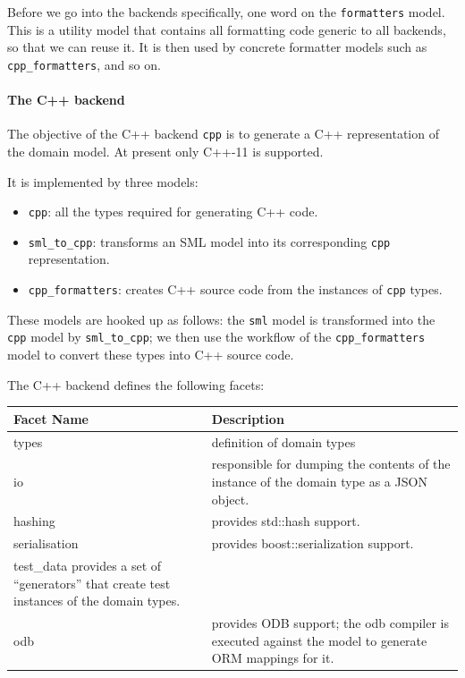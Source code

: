 \documentclass{book}
\begin{document}
Before we go into the backends specifically, one word on the
\texttt{formatters} model. This is a utility model that contains all
formatting code generic to all backends, so that we can reuse it. It
is then used by concrete formatter models such as
\texttt{cpp\_formatters}, and so on.

\paragraph{The C++ backend}

The objective of the C++ backend \texttt{cpp} is to generate a C++
representation of the domain model. At present only C++-11 is
supported.

It is implemented by three models:

\begin{itemize}
\item \texttt{cpp}: all the types required for generating C++ code.
\item \texttt{sml\_to\_cpp}: transforms an SML model into its
  corresponding \texttt{cpp} representation.
\item \texttt{cpp\_formatters}: creates C++ source code from the
  instances of \texttt{cpp} types.
\end{itemize}

These models are hooked up as follows: the \texttt{sml} model is
transformed into the \texttt{cpp} model by \texttt{sml\_to\_cpp}; we
then use the workflow of the \texttt{cpp\_formatters} model to convert
these types into C++ source code.

The C++ backend defines the following facets:

\begin{center}
\begin{tabular}{ll}
Facet Name & Description\\
\hline
types & definition of domain types\\
io & responsible for dumping the contents of the instance of the domain type as a JSON object.\\
hashing & provides std::hash support.\\
serialisation & provides boost::serialization support.\\
test\_data provides a set of ``generators'' that create test instances of the domain types.\\
odb & provides ODB support; the odb compiler is executed against the model to generate ORM mappings for it.\\
\end{tabular}
\end{center}
\end{document}
